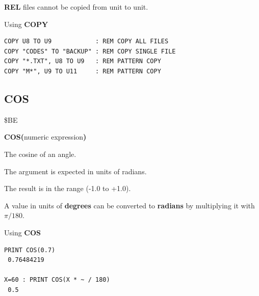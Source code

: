 \begin{description}[leftmargin=2cm,style=nextline]
                  {\bf REL} files cannot be copied from unit to unit.

\item [Examples:] Using {\bf COPY}

\begin{tcolorbox}[colback=black,coltext=white]
\verbatimfont{\codefont}
\begin{verbatim}
COPY U8 TO U9            : REM COPY ALL FILES
COPY "CODES" TO "BACKUP" : REM COPY SINGLE FILE
COPY "*.TXT", U8 TO U9   : REM PATTERN COPY
COPY "M*", U9 TO U11     : REM PATTERN COPY
\end{verbatim}
\end{tcolorbox}
\end{description}


\newpage
\subsection{COS}
\begin{description}[leftmargin=2cm,style=nextline]
\item [Token:]    \$BE

\item [Format:]   {\bf COS(}numeric expression{\bf )}

\item [Returns:]  The cosine of an angle.

                  The argument is expected in units of radians.

                  The result is in the range (-1.0 to +1.0).

\item [Remarks:]  A value in units of {\bf degrees} can be converted to {\bf radians} by multiplying it with $\pi/180$.

\item [Examples:] Using {\bf COS}

\begin{tcolorbox}[colback=black,coltext=white]
\verbatimfont{\codefont}
\begin{verbatim}
PRINT COS(0.7)
 0.76484219

X=60 : PRINT COS(X * ~ / 180)
 0.5
\end{verbatim}
\end{tcolorbox}
\end{description}


\newpage
